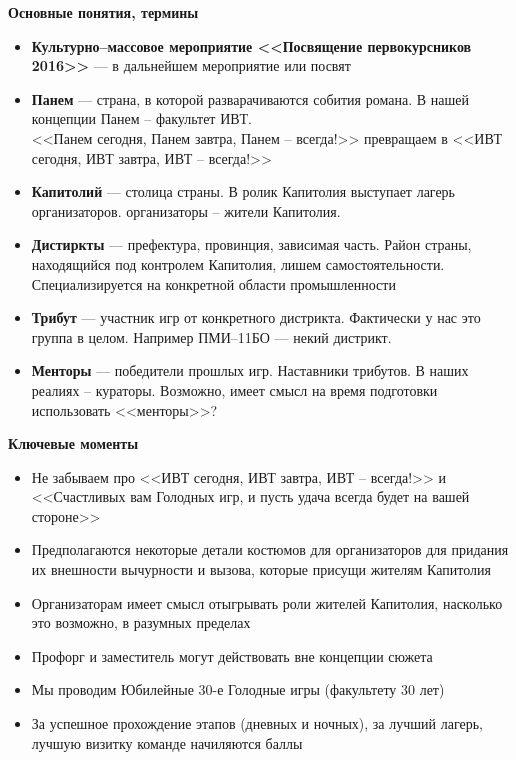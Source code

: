 \documentclass[a4paper, 14pt]{extarticle}
\theoremstyle{definition}
\begin{document}
\textbf{Основные понятия, термины}
\begin{itemize}
\item \textbf{Культурно--массовое мероприятие <<Посвящение первокурсников 2016>>} --- в дальнейшем мероприятие или посвят

\item \textbf{Панем} --- страна, в которой разварачиваются собития романа. В нашей концепции Панем -- факультет ИВТ.\\<<Панем сегодня, Панем завтра, Панем -- всегда!>> превращаем в <<ИВТ сегодня, ИВТ завтра, ИВТ -- всегда!>>

\item \textbf{Капитолий} --- столица страны. В ролик Капитолия выступает лагерь организаторов. организаторы -- жители Капитолия.

\item \textbf{Дистиркты} --- префектура, провинция, зависимая часть. Район страны, находящийся под контролем Капитолия, лишем самостоятельности. Специализируется на конкретной области промышленности

\item \textbf{Трибут} --- участник игр от конкретного дистрикта. Фактически у нас это группа в целом. Например ПМИ--11БО --- некий дистрикт.

\item \textbf{Менторы} --- победители прошлых игр. Наставники трибутов. В наших реалиях -- кураторы. Возможно, имеет смысл на время подготовки использовать <<менторы>>?


\end{itemize}


\textbf{Ключевые моменты}
\begin{itemize}
\item Не забываем про <<ИВТ сегодня, ИВТ завтра, ИВТ -- всегда!>> и <<Счастливых вам Голодных игр, и пусть удача всегда будет на вашей стороне>>

\item Предполагаются некоторые детали костюмов для организаторов для придания их внешности вычурности и вызова, которые присущи жителям Капитолия

\item Организаторам имеет смысл отыгрывать роли жителей Капитолия, насколько это возможно, в разумных пределах

\item Профорг и заместитель могут действовать вне концепции сюжета

\item Мы проводим Юбилейные 30-е Голодные игры (факультету 30 лет)

\item За успешное прохождение этапов (дневных и ночных), за лучший лагерь, лучшую визитку команде начиляются баллы
\end{itemize}
\end{document}

